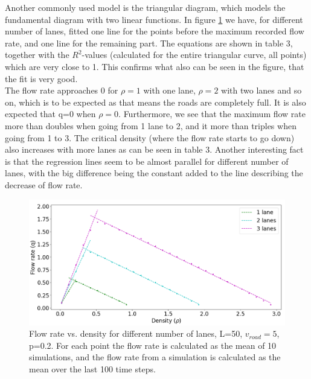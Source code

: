 \documentclass[a4paper,12pt]{article}
\begin{document}
Another commonly used model is the triangular diagram, which models the fundamental diagram with two linear functions. In figure \ref{fig2} we have, for different number of lanes, fitted one line for the points before the maximum recorded flow rate, and one line for the remaining part. The equations are shown in table 3, together with the $R^2$-values (calculated for the entire triangular curve, all points) which are very close to 1. This confirms what also can be seen in the figure, that the fit is very good.\\

The flow rate approaches 0 for $\rho=1$ with one lane, $\rho=2$ with two lanes and so on, which is to be expected as that means the roads are completely full. It is also expected that q=0 when $\rho=0$. Furthermore, we see that the maximum flow rate more than doubles when going from 1 lane to 2, and it more than triples when going from 1 to 3. The critical density (where the flow rate starts to go down) also increases with more lanes as can be seen in table 3. Another interesting fact is that the regression lines seem to be almost parallel for different number of lanes, with the big difference being the constant added to the line describing the decrease of flow rate. 
\begin{figure}[H]
	\centering
        \includegraphics[scale=0.45]{fig2.png}
    \caption{Flow rate vs. density for different number of lanes, L=50, $v_{road}=5$, p=0.2. For each point the flow rate is calculated as the mean of 10 simulations, and the flow rate from a simulation is calculated as the mean over the last 100 time steps.}
    \label{fig2}
\end{figure}
\end{document}
